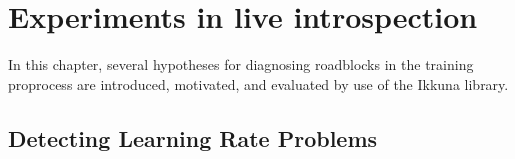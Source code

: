 \chapter{Experiments in live introspection}

In this chapter, several hypotheses for diagnosing roadblocks in the training
proprocess are introduced, motivated, and evaluated by use of the Ikkuna
library.

\section{Detecting Learning Rate Problems}%
\label{sec:detecting_learning_rate_problems}
